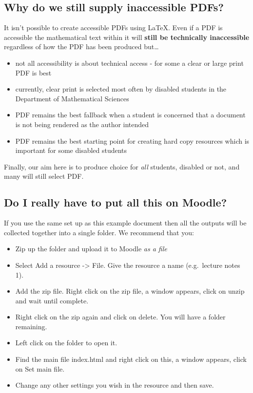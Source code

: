 \documentclass[
  10pt,
  a4paper]{article}
\providecommand{\tightlist}{%
  \setlength{\itemsep}{0pt}\setlength{\parskip}{0pt}}
\theoremstyle{plain}
\theoremstyle{definition}
\theoremstyle{plain}
\theoremstyle{plain}
\theoremstyle{plain}
\theoremstyle{plain}
\theoremstyle{definition}
\theoremstyle{definition}
\theoremstyle{remark}
\theoremstyle{remark}
\begin{document}
\hypertarget{why-do-we-still-supply-inaccessible-pdfs}{%
\subsection{Why do we still supply inaccessible PDFs?}\label{why-do-we-still-supply-inaccessible-pdfs}}

It isn't possible to create accessible PDFs using LaTeX. Even if a PDF is accessible the mathematical text within it will \textbf{still be technically inaccessible} regardless of how the PDF has been produced but\ldots{}

\begin{itemize}
\tightlist
\item
  not all accessibility is about technical access - for some a clear or large print PDF is best
\item
  currently, clear print is selected most often by disabled students in the Department of Mathematical Sciences
\item
  PDF remains the best fallback when a student is concerned that a document is not being rendered as the author intended
\item
  PDF remains the best starting point for creating hard copy resources which is important for some disabled students
\end{itemize}

Finally, our aim here is to produce choice for \emph{all} students, disabled or not, and many will still select PDF.

\hypertarget{do-i-really-have-to-put-all-this-on-moodle}{%
\subsection{Do I really have to put all this on Moodle?}\label{do-i-really-have-to-put-all-this-on-moodle}}

If you use the same set up as this example document then all the outputs will be collected together into a single folder. We recommend that you:

\begin{itemize}
\tightlist
\item
  Zip up the folder and upload it to Moodle \emph{as a file}
\item
  Select Add a resource -\textgreater{} File. Give the resource a name (e.g.~lecture notes 1).
\item
  Add the zip file. Right click on the zip file, a window appears, click on unzip and wait until complete.
\item
  Right click on the zip again and click on delete. You will have a folder remaining.
\item
  Left click on the folder to open it.
\item
  Find the main file index.html and right click on this,
  a window appears, click on Set main file.
\item
  Change any other settings you wish in the resource and then save.
\end{itemize}
\end{document}
